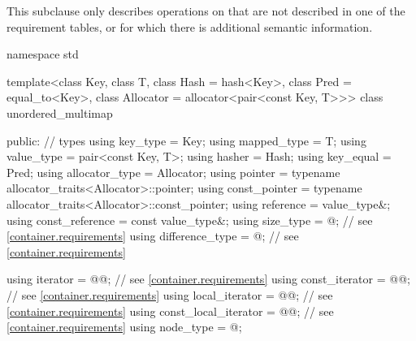 \pnum
This subclause only describes operations on 
that are not described in one of the requirement tables, or for which
there is additional semantic information.

%
\begin{codeblock}
namespace std {
  template<class Key,
           class T,
           class Hash = hash<Key>,
           class Pred = equal_to<Key>,
           class Allocator = allocator<pair<const Key, T>>>
  class unordered_multimap {
  public:
    // types
    using key_type             = Key;
    using mapped_type          = T;
    using value_type           = pair<const Key, T>;
    using hasher               = Hash;
    using key_equal            = Pred;
    using allocator_type       = Allocator;
    using pointer              = typename allocator_traits<Allocator>::pointer;
    using const_pointer        = typename allocator_traits<Allocator>::const_pointer;
    using reference            = value_type&;
    using const_reference      = const value_type&;
    using size_type            = @\impdef@; // see \ref{container.requirements}
    using difference_type      = @\impdef@; // see \ref{container.requirements}

    using iterator             = @@; // see \ref{container.requirements}
    using const_iterator       = @@; // see \ref{container.requirements}
    using local_iterator       = @@; // see \ref{container.requirements}
    using const_local_iterator = @@; // see \ref{container.requirements}
    using node_type            = @\unspec@;

}}
\end{codeblock}
